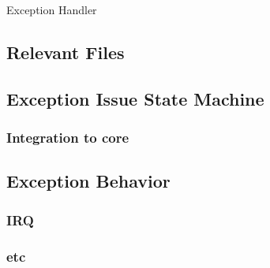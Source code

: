 \label{sec:exh}
Exception Handler 

\subsection{Relevant Files}

\subsection{Exception Issue State Machine}

\subsubsection{Integration to core}

\subsection{Exception Behavior}

\subsubsection{IRQ}

\subsubsection{etc}